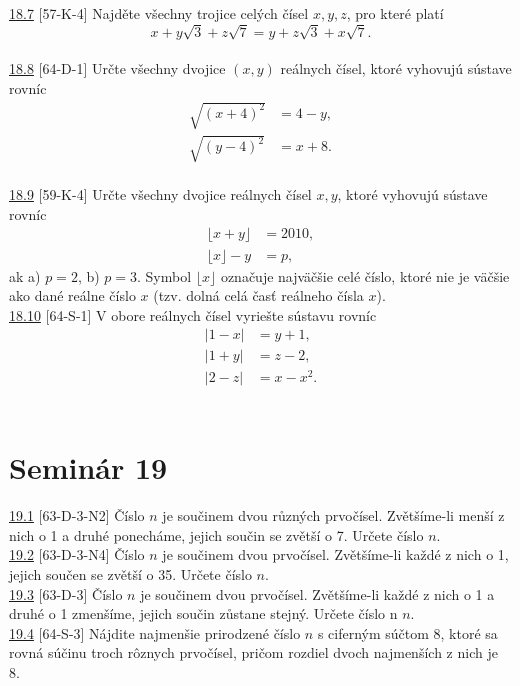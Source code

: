 \noindent \ul{18.7} [57-K-4]
Najděte všechny trojice celých čísel $x, y, z$, pro které platí
$$x+y\sqrt{3}+z\sqrt{7}=y+z\sqrt{3}+x\sqrt{7}. $$\\

\noindent \ul{18.8} [64-D-1]
Určte všechny dvojice $(x, y)$ reálnych čísel, ktoré vyhovujú sústave rovníc
\begin{align*}
\sqrt{(x + 4)^2} &= 4 - y,\\
\sqrt{(y - 4)^2} &= x + 8.
\end{align*}\\

\noindent \ul{18.9} [59-K-4] Určte všechny dvojice reálnych čísel $x, y$, ktoré vyhovujú sústave rovníc
\begin{align*}
\lfloor x + y\rfloor &= 2 010,\\
\lfloor x\rfloor - y &= p,
\end{align*}
ak a) $p = 2$, b) $p = 3$.
Symbol $\lfloor x \rfloor$ označuje najväčšie celé číslo, ktoré nie je väčšie ako dané reálne číslo $x$ (tzv. dolná celá časť reálneho čísla $x$).\\

\noindent \ul{18.10} [64-S-1]
V obore reálnych čísel vyriešte sústavu rovníc
\begin{align*}
|1 - x| &= y + 1,\\
|1 + y| &= z - 2,\\
|2 - z| &= x - x^2.
\end{align*}\\

\section*{Seminár 19}

\noindent \ul{19.1} [63-D-3-N2] Číslo $n$ je součinem dvou různých prvočísel.
Zvětšíme-li menší z nich o 1 a druhé ponecháme, jejich součin se zvětší o 7.
Určete číslo $n$.\\

\noindent \ul{19.2} [63-D-3-N4] Číslo $n$ je součinem dvou prvočísel.
Zvětšíme-li každé z nich o 1, jejich součen se zvětší o 35. Určete číslo $n$.\\

\noindent \ul{19.3} [63-D-3] Číslo $n$ je součinem dvou prvočísel. Zvětšíme-li
každé z nich o 1 a druhé o 1 zmenšíme, jejich součin zůstane stejný. Určete
číslo n $n$.\\
\noindent \ul{19.4} [64-S-3]
Nájdite najmenšie prirodzené číslo $n$ s ciferným súčtom 8, ktoré sa rovná súčinu troch rôznych prvočísel, pričom rozdiel dvoch najmenších z nich je 8.\\

